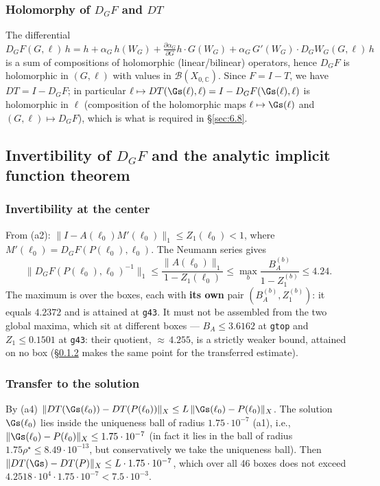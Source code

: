 \subsubsection{Holomorphy of $D_GF$ and $DT$}
\label{sec:6.5.1}

The differential
\[
D_GF(G,\ell)\,h
=h+\alpha_G\,h(W_G)+\tfrac{\partial\alpha_G}{\partial G}h\cdot G(W_G)
+\alpha_G\,G'(W_G)\cdot D_GW_G(G,\ell)\,h
\]
is a sum of compositions of holomorphic (linear/bilinear) operators, hence $D_GF$ is holomorphic in $(G,\ell)$ with values in $\mathcal B(X_{0,\mathbb C})$. Since $F=I-T$, we have $DT=I-D_GF$; in particular $\ell\mapsto DT(\Gs(\ell),\ell)=I-D_GF(\Gs(\ell),\ell)$ is holomorphic in $\ell$ (composition of the holomorphic maps $\ell\mapsto \Gs(\ell)$ and $(G,\ell)\mapsto D_GF$), which is what is required in \S\ref{sec:6.8}.


\subsection{Invertibility of $D_GF$ and the analytic implicit function theorem}
\label{sec:6.6}

\subsubsection{Invertibility at the center}
\label{sec:6.6.1}

From (a2): $\|I-A(\ell_0)M'(\ell_0)\|_1\le Z_1(\ell_0)<1$, where $M'(\ell_0)=D_GF(P(\ell_0),\ell_0)$. The Neumann series gives
\[
\|D_GF(P(\ell_0),\ell_0)^{-1}\|_1
\le\frac{\|A(\ell_0)\|_1}{1-Z_1(\ell_0)}
\le\max_{b}\frac{B_A^{(b)}}{1-Z_1^{(b)}}
\le4.24.
\]
The maximum is over the boxes, each with \textbf{its own} pair $(B_A^{(b)},Z_1^{(b)})$:
it equals $4.2372$ and is attained at \texttt{g43}. It must not be assembled from
the two global maxima, which sit at different boxes --- $B_A\le 3.6162$ at
\texttt{gtop} and $Z_1\le 0.1501$ at \texttt{g43}: their quotient, ${\approx}\,4.255$,
is a strictly weaker bound, attained on no box (\S\ref{sec:6.6.2} makes the
same point for the transferred estimate).

\subsubsection{Transfer to the solution}
\label{sec:6.6.2}

By (a4) $\|DT(\Gs(\ell_0))-DT(P(\ell_0))\|_X\le L\,\|\Gs(\ell_0)-P(\ell_0)\|_X$. The solution $\Gs(\ell_0)$ lies inside the uniqueness ball of radius $1.75\cdot10^{-7}$ (a1), i.e., $\|\Gs(\ell_0)-P(\ell_0)\|_X\le1.75\cdot10^{-7}$ (in fact it lies in the ball of radius $1.75\rho^{\star}\le8.49\cdot10^{-13}$, but conservatively we take the uniqueness ball). Then $\|DT(\Gs)-DT(P)\|_X\le L\cdot1.75\cdot10^{-7}$, which over all 46 boxes does not exceed $4.2518\cdot10^4\cdot1.75\cdot10^{-7}<7.5\cdot10^{-3}$.

